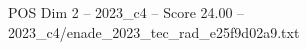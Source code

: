 \begin{textsample}{POS Dim 2 – 2023\_c4 – Score 24.00 – 2023\_c4/enade\_2023\_tec\_rad\_e25f9d02a9.txt}
\end{textsample}
